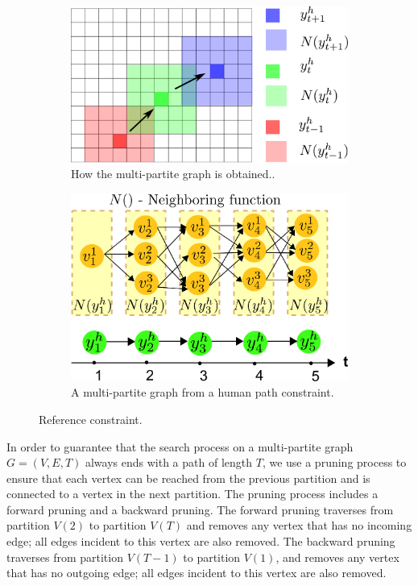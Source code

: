 \documentclass[phd]{byuprop}
\begin{document}
\begin{figure}[htbp]
	\centering
	\begin{subfigure}[t]{0.45\linewidth}
		\centering
		\includegraphics[width=\textwidth]{fig/humanConstraint.pdf}
		\caption{How the multi-partite graph is obtained..}
		\label{fig:humanConstraint}
	\end{subfigure}  
	\begin{subfigure}[t]{0.45\linewidth}
		\centering
		\includegraphics[width=\textwidth]{fig/MultiPartite.pdf}
		\caption{A multi-partite graph from a human path constraint.}
		\label{fig:MultiPartite}
	\end{subfigure}   
	\caption{Reference constraint.}
	\label{fig:reference_constraint}
\end{figure}

In order to guarantee that the search process on a multi-partite graph $ G = (V, E, T) $ always ends with a path of length $ T $, we use a pruning process to ensure that each vertex can be reached from the previous partition and is connected to a vertex in the next partition.
The pruning process includes a forward pruning and a backward pruning.
The forward pruning traverses from partition $ V(2) $ to partition $ V(T) $ and removes any vertex that has no incoming edge; all edges incident to this vertex are also removed.
The backward pruning traverses from partition $ V(T-1) $ to partition $ V(1) $, and removes any vertex that has no outgoing edge; all edges incident to this vertex are also removed.
\end{document}
